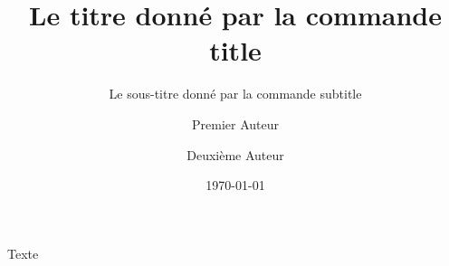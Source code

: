 \documentclass[%
]{article}
\title{Le titre donné par la commande title}
\subtitle{Le sous-titre donné par la commande subtitle}
\author{Premier Auteur \and Deuxième Auteur}
\date{\today}
\begin{document}
\maketitle

Texte
\end{document}
